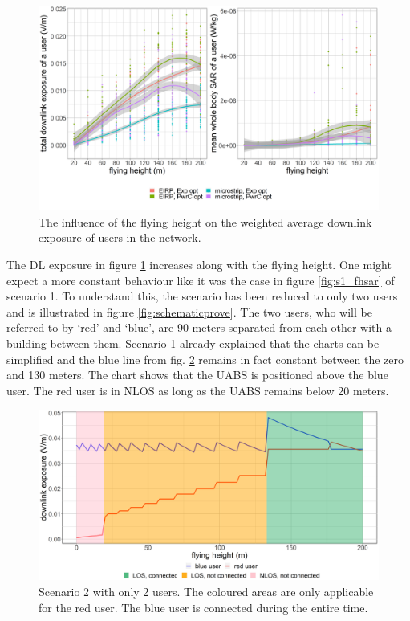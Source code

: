 \begin{figure}[h!]
  \includegraphics[width=\textwidth]{../results/s2/fhvsdlAndPc.png}
  \caption{The influence of the flying height on the weighted average downlink exposure of users in the network.}
  \label{fig:s2a_dlAndPc}
\end{figure}



The \gls{DL} exposure in figure \ref{fig:s2a_dlAndPc} increases along with the flying height. One might expect a more constant 
behaviour like it was the case in figure \ref{fig:s1_fhsar} of scenario 1. To understand this, the scenario has been reduced  
to only two users and is illustrated in figure \ref{fig:schematicprove}.
The two users, who will be referred to by `red' and `blue', are 90 meters separated from each other with a building between them.
Scenario 1 already explained that the charts can be simplified and the blue line from fig. \ref{fig:prove} remains in fact constant between the zero and 130 meters.
The chart shows that the \gls{UABS} is positioned above the blue user. The red user is in \gls{NLOS} as long as the \gls{UABS} remains below 20 meters.

\begin{figure}[]
  \includegraphics[width=\textwidth]{../results/s2/prove.png}
  \caption{Scenario 2 with only 2 users. The coloured areas are only applicable for the red user. The blue user is connected during the entire time.}
  \label{fig:prove}
\end{figure}



